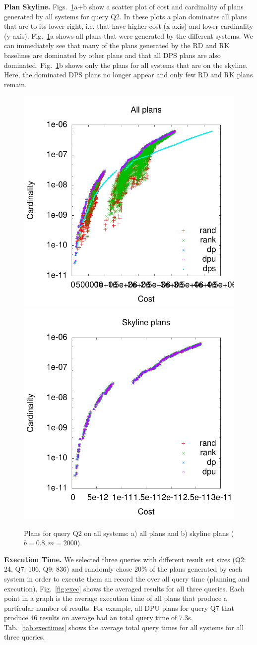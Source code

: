 \textbf{Plan Skyline.} Figs.~\ref{fig:pareto_q2_skyline}a+b show a
scatter plot of cost and cardinality of plans generated by all systems
for query Q2. In these plots a plan dominates all plans that are to
its lower right, i.e. that have higher cost (x-axis) and lower
cardinality (y-axis). Fig.~\ref{fig:pareto_q2_skyline}a shows all
plans that were generated by the different systems. We can immediately
see that many of the plans generated by the RD and RK baselines are
dominated by other plans and that all DPS plans are also
dominated. Fig.~\ref{fig:pareto_q2_skyline}b shows only the plans for
all systems that are on the skyline. Here, the dominated DPS plans no
longer appear and only few RD and RK plans remain.

\begin{figure}[htb]
  \centering
  \includegraphics[width=0.49\linewidth]{figs/plans_q2_all.pdf}
  \includegraphics[width=0.49\linewidth]{figs/plans_q2_sky.pdf}
  \caption{Plans for query Q2 on all systems: a) all plans and b)
    skyline plans ($b=0.8,m=2000$).}
  \label{fig:pareto_q2_skyline}
\end{figure}

\textbf{Execution Time.} We selected three queries with different
result set sizes (Q2: 24, Q7: 106, Q9: 836) and randomly chose 20\% of
the plans generated by each system in order to execute them an record
the over all query time (planning and execution). Fig.~\ref{fig:exec}
shows the averaged results for all three queries. Each point in a
graph is the average execution time of all plans that produce a
particular number of results. For example, all DPU plans for query Q7
that produce 46 results on average had an total query time of
7.3s. Tab.~\ref{tab:exectimes} shows the average total query times for
all systems for all three queries.

